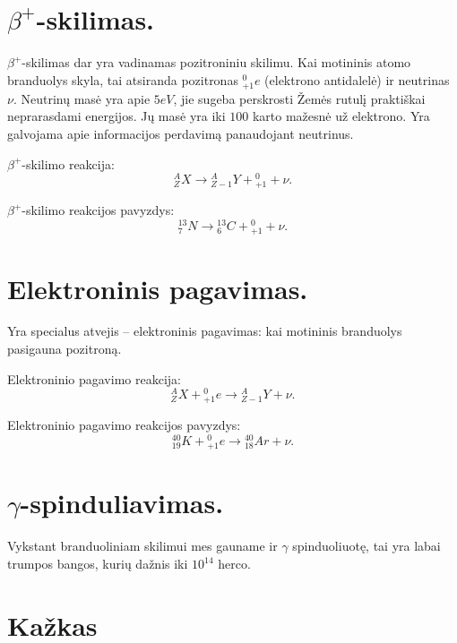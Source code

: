 \section{$\beta^{+}$-skilimas.}

$\beta^{+}$-skilimas dar yra vadinamas pozitroniniu skilimu. Kai
motininis atomo branduolys skyla, tai atsiranda pozitronas
${}_{+1}^{0}e$ (elektrono antidalelė) ir neutrinas $\nu$. Neutrinų masė
yra apie $5 eV$, jie sugeba perskrosti Žemės rutulį praktiškai
neprarasdami energijos. Jų masė yra iki $100$ karto mažesnė už
elektrono. Yra galvojama apie informacijos perdavimą panaudojant
neutrinus.

$\beta^{+}$-skilimo reakcija:
\begin{equation*}
  {}_{Z}^{A}X \to {}_{Z-1}^{A}Y + {}_{+1}^{0} + \nu.
\end{equation*}

$\beta^{+}$-skilimo reakcijos pavyzdys:
\begin{equation*}
  {}_{7}^{13}N \to {}_{6}^{13}C + {}_{+1}^{0} + \nu.
\end{equation*}

\section{Elektroninis pagavimas.}

Yra specialus atvejis – elektroninis pagavimas: kai motininis
branduolys pasigauna pozitroną.

Elektroninio pagavimo reakcija:
\begin{equation*}
  {}_{Z}^{A}X + {}_{+1}^{0}e \to {}_{Z-1}^{A}Y + \nu.
\end{equation*}

Elektroninio pagavimo reakcijos pavyzdys:
\begin{equation*}
  {}_{19}^{40}K + {}_{+1}^{0}e \to {}_{18}^{40}Ar + \nu.
\end{equation*}

\section{$\gamma$-spinduliavimas.}

Vykstant branduoliniam skilimui mes gauname ir $\gamma$ spinduoliuotę,
tai yra labai trumpos bangos, kurių dažnis iki $10^{14}$ herco.

\section{Kažkas}

